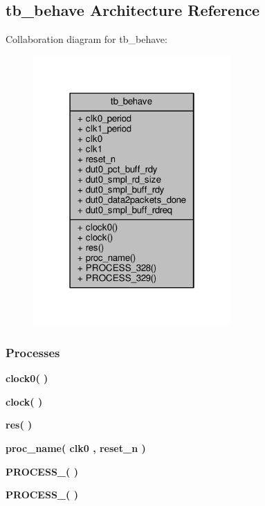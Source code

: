 \subsection{tb\+\_\+behave Architecture Reference}
\label{classdata2packets__fsm__tb_1_1tb__behave}


Collaboration diagram for tb\+\_\+behave\+:\nopagebreak
\begin{figure}[H]
\begin{center}
\leavevmode
\includegraphics[width=214pt]{d0/d13/classdata2packets__fsm__tb_1_1tb__behave__coll__graph}
\end{center}
\end{figure}
\subsubsection*{Processes}
 \begin{DoxyCompactItemize}
\item 
{\bf clock0}{\bfseries  (  )}
\item 
{\bf clock}{\bfseries  (  )}
\item 
{\bf res}{\bfseries  (  )}
\item 
{\bf proc\+\_\+name}{\bfseries  ( {\bfseries {\bfseries {\bf clk0}} \textcolor{vhdlchar}{ }} , {\bfseries {\bfseries {\bf reset\+\_\+n}} \textcolor{vhdlchar}{ }} )}
\item 
{\bf P\+R\+O\+C\+E\+S\+S\+\_}{\bfseries  (  )}
\item 
{\bf P\+R\+O\+C\+E\+S\+S\+\_}{\bfseries  (  )}
\end{DoxyCompactItemize}
